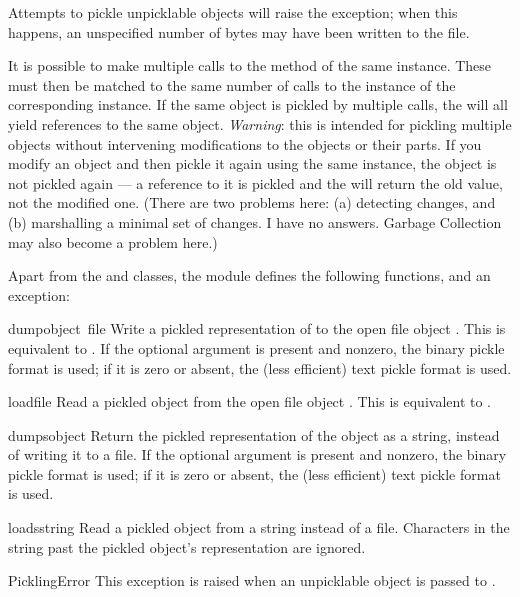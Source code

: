 Attempts to pickle unpicklable objects will raise the
 exception; when this happens, an unspecified
number of bytes may have been written to the file.

It is possible to make multiple calls to the  method of
the same  instance.  These must then be matched to the
same number of calls to the  instance of the
corresponding  instance.  If the same object is
pickled by multiple  calls, the  will all
yield references to the same object.  \emph{Warning}: this is intended
for pickling multiple objects without intervening modifications to the
objects or their parts.  If you modify an object and then pickle it
again using the same  instance, the object is not
pickled again --- a reference to it is pickled and the
 will return the old value, not the modified one.
(There are two problems here: (a) detecting changes, and (b)
marshalling a minimal set of changes.  I have no answers.  Garbage
Collection may also become a problem here.)

Apart from the  and  classes, the
module defines the following functions, and an exception:

\begin{funcdesc}{dump}{object\, file}
Write a pickled representation of  to the open file object
.  This is equivalent to
.
If the optional  argument is present and nonzero, the binary
pickle format is used; if it is zero or absent, the (less efficient)
text pickle format is used.
\end{funcdesc}

\begin{funcdesc}{load}{file}
Read a pickled object from the open file object .  This is
equivalent to .
\end{funcdesc}

\begin{funcdesc}{dumps}{object}
Return the pickled representation of the object as a string, instead
of writing it to a file.  If the optional  argument is
present and nonzero, the binary pickle format is used; if it is zero
or absent, the (less efficient) text pickle format is used.
\end{funcdesc}

\begin{funcdesc}{loads}{string}
Read a pickled object from a string instead of a file.  Characters in
the string past the pickled object's representation are ignored.
\end{funcdesc}

\begin{excdesc}{PicklingError}
This exception is raised when an unpicklable object is passed to
.
\end{excdesc}
